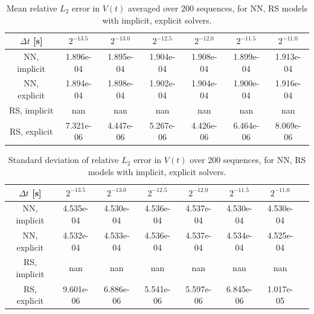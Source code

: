 \begin{table}[H]
    \centering
    \begin{tabular}{ccccccc}
        \hline
        $\Delta t$ [s] & $2^{-13.5}$ & $2^{-13.0}$ & $2^{-12.5}$ & $2^{-12.0}$ & $2^{-11.5}$ & $2^{-11.0}$ \\
        \hline
        NN, implicit & 1.896e-04 & 1.895e-04 & 1.904e-04 & 1.908e-04 & 1.899e-04 & 1.913e-04 \\
        NN, explicit & 1.894e-04 & 1.898e-04 & 1.902e-04 & 1.904e-04 & 1.900e-04 & 1.916e-04 \\
        RS, implicit & nan & nan & nan & nan & nan & nan \\
        RS, explicit & 7.321e-06 & 4.447e-06 & 5.267e-06 & 4.426e-06 & 6.464e-06 & 8.069e-06 \\
        \hline
    \end{tabular}
    \caption{Mean relative $L_2$ error in $V(t)$ averaged over 200 sequences, 
    for NN, RS models with implicit, explicit solvers.}
    \label{tab:MeanL2ErrorSpringSliderRsVsNNUniversal}
\end{table}

\begin{table}[H]
    \centering
    \begin{tabular}{cccccccc}
        \hline
        $\Delta t$ [s] & $2^{-13.5}$ & $2^{-13.0}$ & $2^{-12.5}$ & $2^{-12.0}$ & $2^{-11.5}$ & $2^{-11.0}$ \\
        \hline
        NN, implicit & 4.535e-04 & 4.530e-04 & 4.536e-04 & 4.537e-04 & 4.530e-04 & 4.530e-04 \\
        NN, explicit & 4.532e-04 & 4.533e-04 & 4.536e-04 & 4.537e-04 & 4.534e-04 & 4.525e-04 \\
        RS, implicit & nan & nan & nan & nan & nan & nan \\
        RS, explicit & 9.601e-06 & 6.886e-06 & 5.541e-06 & 5.597e-06 & 6.845e-06 & 1.017e-05 \\
        \hline
    \end{tabular}
    \caption{Standard deviation of relative $L_2$ error in $V(t)$ over 200 sequences, 
    for NN, RS models with implicit, explicit solvers.}
    \label{tab:StdL2ErrorSpringSliderRsVsNNUniversal}
\end{table}

\newpage
